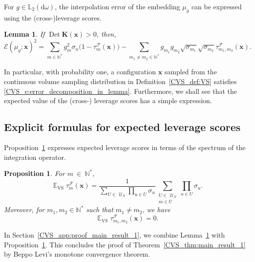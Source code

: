 \documentclass[twoside,11pt]{book}
\newtheorem{proposition}{Proposition}
\newtheorem{lemma}{Lemma}
\numberwithin{theorem}{chapter}
\numberwithin{definition}{chapter}
\numberwithin{proposition}{chapter}
\numberwithin{corollary}{chapter}
\numberwithin{example}{chapter}
\numberwithin{lemma}{chapter}
\numberwithin{assumption}{chapter}
\numberwithin{equation}{chapter}
\numberwithin{figure}{chapter}
\DeclareMathOperator{\Det}{Det}
\DeclareMathOperator{\VS}{\mathrm{VS}}
\DeclareMathOperator{\EX}{\mathbb{E}}
\DeclareMathOperator{\F}{\mathcal{F}}
\def\Ltwo{\mathbb{L}_{2}(\mathrm{d} \omega)}
\def\UN{\:\mathcal{U}_N}
\begin{document}
For $g \in \Ltwo$, the interpolation error of the embedding $\mu_{g}$ can be expressed using the (cross-)leverage scores.
\begin{lemma}\label{CVS_lemma:error_decomposition}
If $\Det \bm{K}(\bm{x}) > 0$, then,
\begin{equation}
\label{CVS_e:error_decomposition_in_lemma}
\mathcal{E}(\mu_{g};\bm{x})^{2} = \sum\limits_{m \in \mathbb{N}^{*}}  g_{m}^{2} \sigma_{n}\bigg(1- \tau_{m}^{\F}(\bm{x})\bigg) - \sum\limits_{m_{1}\neq m_{2} \in \mathbb{N}^{*}}  g_{m_{1}}g_{m_{2}} \sqrt{\sigma_{m_{1}}} \sqrt{\sigma_{m_{2}}} \tau_{m_{1},m_{2}}^{\F}(\bm{x}).
\end{equation}
\end{lemma}
In particular, with probability one, a configuration $\bm{x}$ sampled from the continuous volume sampling distribution in Definition~\ref{CVS_def:VS} satisfies \eqref{CVS_e:error_decomposition_in_lemma}. Furthermore, we shall see that the expected value of the (cross-) leverage scores has a simple expression.


\subsection{Explicit formulas for expected leverage scores}
\label{CVS_sec:closed_formulas}
Proposition~\ref{CVS_prop:EX_VS_lvs} expresses expected leverage scores in terms of the spectrum of the integration operator.
\begin{proposition}\label{CVS_prop:EX_VS_lvs}
For $m~\in~\mathbb{N}^{*}$,
\begin{equation}\label{CVS_eq:lvs_formula}
\EX_{\VS} \tau_{m}^{\F}(\bm{x})  = \frac{1}{\sum\limits_{U \in \: \UN} \prod\limits_{u \in U}\sigma_{u}}  \sum\limits_{\substack{U \in \: \UN \\ m \in U}} \prod\limits_{u \in U}\sigma_{u}.
\end{equation}
Moreover, for $m_{1},m_{2} \in \mathbb{N}^{*}$ such that $m_{1} \neq m_{2}$, we have
\begin{equation}\label{CVS_eq:cross_lvs_zero}
\EX_{\VS} \tau_{m_{1},m_{2}}^{\F}(\bm{x}) = 0.
\end{equation}
\end{proposition}

In Section~\ref{CVS_app:proof_main_result_1}, we combine Lemma~\ref{CVS_lemma:error_decomposition} with Proposition~\ref{CVS_prop:EX_VS_lvs}. This concludes the proof of Theorem~\ref{CVS_thm:main_result_1} by Beppo Levi's monotone convergence theorem.
\end{document}

